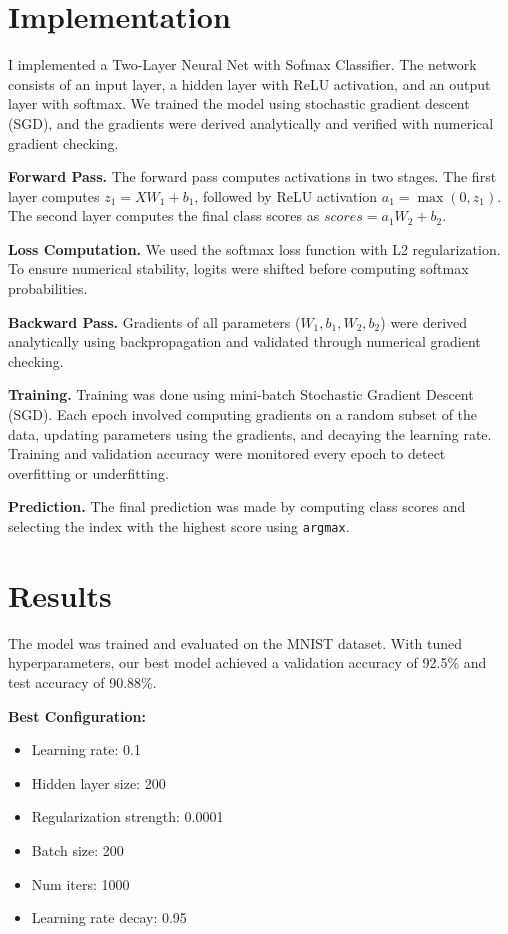 \section{Implementation}
\label{sec:implementation}

I implemented a Two-Layer Neural Net with Sofmax Classifier.
The network consists of an input layer, a hidden layer with ReLU activation, and an output layer with softmax.
We trained the model using stochastic gradient descent (SGD), and the gradients were derived analytically and verified with numerical gradient checking.

\textbf{Forward Pass.} The forward pass computes activations in two stages. The first layer computes $z_1 = XW_1 + b_1$, followed by ReLU activation $a_1 = \max(0, z_1)$. The second layer computes the final class scores as $scores = a_1W_2 + b_2$.

\textbf{Loss Computation.} We used the softmax loss function with L2 regularization. To ensure numerical stability, logits were shifted before computing softmax probabilities.

\textbf{Backward Pass.} Gradients of all parameters ($W_1, b_1, W_2, b_2$) were derived analytically using backpropagation and validated through numerical gradient checking.

\textbf{Training.} Training was done using mini-batch Stochastic Gradient Descent (SGD). Each epoch involved computing gradients on a random subset of the data, updating parameters using the gradients, and decaying the learning rate. Training and validation accuracy were monitored every epoch to detect overfitting or underfitting.

\textbf{Prediction.} The final prediction was made by computing class scores and selecting the index with the highest score using \texttt{argmax}.


\section{Results}
\label{sec:results}

The model was trained and evaluated on the MNIST dataset.
With tuned hyperparameters, our best model achieved a validation accuracy of 92.5\% and test accuracy of 90.88\%.

\textbf{Best Configuration:} 
\begin{itemize}
  \item Learning rate: 0.1
  \item Hidden layer size: 200
  \item Regularization strength: 0.0001
  \item Batch size: 200
  \item Num iters: 1000
  \item Learning rate decay: 0.95
\end{itemize}

